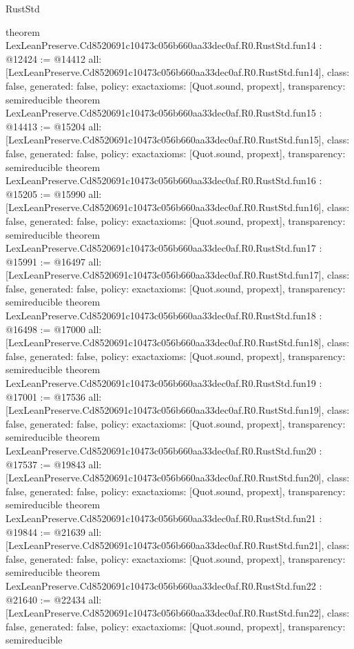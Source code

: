 \begin{lexlean}{RustStd}
\begin{coremodule}
{}
theorem LexLeanPreserve.Cd8520691c10473c056b660aa33dec0af.R0.RustStd.fun14 : @12424 := @14412 {
  all: [LexLeanPreserve.Cd8520691c10473c056b660aa33dec0af.R0.RustStd.fun14],
  class: false,
  generated: false,
  policy: exact{axioms: [Quot.sound, propext]},
  transparency: semireducible
}
theorem LexLeanPreserve.Cd8520691c10473c056b660aa33dec0af.R0.RustStd.fun15 : @14413 := @15204 {
  all: [LexLeanPreserve.Cd8520691c10473c056b660aa33dec0af.R0.RustStd.fun15],
  class: false,
  generated: false,
  policy: exact{axioms: [Quot.sound, propext]},
  transparency: semireducible
}
theorem LexLeanPreserve.Cd8520691c10473c056b660aa33dec0af.R0.RustStd.fun16 : @15205 := @15990 {
  all: [LexLeanPreserve.Cd8520691c10473c056b660aa33dec0af.R0.RustStd.fun16],
  class: false,
  generated: false,
  policy: exact{axioms: [Quot.sound, propext]},
  transparency: semireducible
}
theorem LexLeanPreserve.Cd8520691c10473c056b660aa33dec0af.R0.RustStd.fun17 : @15991 := @16497 {
  all: [LexLeanPreserve.Cd8520691c10473c056b660aa33dec0af.R0.RustStd.fun17],
  class: false,
  generated: false,
  policy: exact{axioms: [Quot.sound, propext]},
  transparency: semireducible
}
theorem LexLeanPreserve.Cd8520691c10473c056b660aa33dec0af.R0.RustStd.fun18 : @16498 := @17000 {
  all: [LexLeanPreserve.Cd8520691c10473c056b660aa33dec0af.R0.RustStd.fun18],
  class: false,
  generated: false,
  policy: exact{axioms: [Quot.sound, propext]},
  transparency: semireducible
}
theorem LexLeanPreserve.Cd8520691c10473c056b660aa33dec0af.R0.RustStd.fun19 : @17001 := @17536 {
  all: [LexLeanPreserve.Cd8520691c10473c056b660aa33dec0af.R0.RustStd.fun19],
  class: false,
  generated: false,
  policy: exact{axioms: [Quot.sound, propext]},
  transparency: semireducible
}
theorem LexLeanPreserve.Cd8520691c10473c056b660aa33dec0af.R0.RustStd.fun20 : @17537 := @19843 {
  all: [LexLeanPreserve.Cd8520691c10473c056b660aa33dec0af.R0.RustStd.fun20],
  class: false,
  generated: false,
  policy: exact{axioms: [Quot.sound, propext]},
  transparency: semireducible
}
theorem LexLeanPreserve.Cd8520691c10473c056b660aa33dec0af.R0.RustStd.fun21 : @19844 := @21639 {
  all: [LexLeanPreserve.Cd8520691c10473c056b660aa33dec0af.R0.RustStd.fun21],
  class: false,
  generated: false,
  policy: exact{axioms: [Quot.sound, propext]},
  transparency: semireducible
}
theorem LexLeanPreserve.Cd8520691c10473c056b660aa33dec0af.R0.RustStd.fun22 : @21640 := @22434 {
  all: [LexLeanPreserve.Cd8520691c10473c056b660aa33dec0af.R0.RustStd.fun22],
  class: false,
  generated: false,
  policy: exact{axioms: [Quot.sound, propext]},
  transparency: semireducible
}
\end{coremodule}
\end{lexlean}
